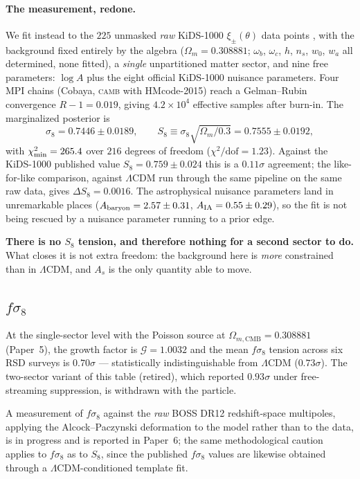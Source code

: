\documentclass[12pt,a4paper]{article}
\newcommand{\Omm}{\Omega_{m}}
\newcommand{\OmmCMB}{\Omega_{m,\mathrm{CMB}}}
\newcommand{\fsig}{f\sigma_8}
\begin{document}
\paragraph{The measurement, redone.} We fit instead to the $225$ unmasked
\emph{raw} KiDS-1000 $\xi_\pm(\theta)$ data points \citep{Asgari2021}, with the
background fixed entirely by the algebra ($\Omm=0.308881$; $\omega_b$,
$\omega_c$, $h$, $n_s$, $w_0$, $w_a$ all determined, none fitted), a
\emph{single} unpartitioned matter sector, and nine free parameters: $\log A$
plus the eight official KiDS-1000 nuisance parameters. Four MPI chains
(Cobaya, \textsc{camb} with HMcode-2015) reach a Gelman--Rubin convergence
$R-1=0.019$, giving $4.2\times10^4$ effective samples after burn-in. The
marginalized posterior is
\begin{equation}
  \sigma_8 = 0.7446\pm0.0189,
  \qquad
  S_8 \equiv \sigma_8\sqrt{\Omm/0.3} = 0.7555\pm0.0192,
  \label{eq:s8_raw}
\end{equation}
with $\chi^2_{\rm min}=265.4$ over $216$ degrees of freedom
($\chi^2/\mathrm{dof}=1.23$). Against the KiDS-1000 published value
$S_8=0.759\pm0.024$ this is a $0.11\sigma$ agreement; the like-for-like comparison, against $\Lambda$CDM run through the same pipeline on the same raw data, gives $\Delta S_8=0.0016$. The astrophysical
nuisance parameters land in unremarkable places
($A_{\rm baryon}=2.57\pm0.31$, $A_{\rm IA}=0.55\pm0.29$), so the fit is not
being rescued by a nuisance parameter running to a prior edge.

\textbf{There is no $S_8$ tension, and therefore nothing for a second sector to
do.} What closes it is not extra freedom: the background here is \emph{more}
constrained than in $\Lambda$CDM, and $A_s$ is the only quantity able to move.

\subsection{$f\sigma_8$}
\label{sec:tension_table}

At the single-sector level with the Poisson source at $\OmmCMB=0.308881$
(Paper~5), the growth factor is $\mathcal{G}=1.0032$ and the mean $\fsig$
tension across six RSD surveys is $0.70\sigma$ --- statistically
indistinguishable from $\Lambda$CDM ($0.73\sigma$). The two-sector variant of
this table (retired), which reported $0.93\sigma$ under free-streaming
suppression, is withdrawn with the particle.

A measurement of $\fsig$ against the \emph{raw} BOSS DR12 redshift-space
multipoles, applying the Alcock--Paczynski deformation to the model rather
than to the data, is in progress and is reported in Paper~6; the same
methodological caution applies to $\fsig$ as to $S_8$, since the published
$\fsig$ values are likewise obtained through a $\Lambda$CDM-conditioned
template fit.
\end{document}
